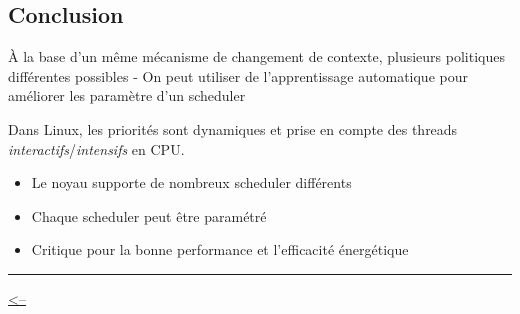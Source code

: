 \subsection{Conclusion}\label{conclusion}

À la base d'un même mécanisme de changement de contexte, plusieurs
politiques différentes possibles - On peut utiliser de l'apprentissage
automatique pour améliorer les paramètre d'un scheduler

Dans Linux, les priorités sont dynamiques et prise en compte des threads
\emph{interactifs}/\emph{intensifs} en CPU.

\begin{itemize}
\tightlist
\item
  Le noyau supporte de nombreux scheduler différents
\item
  Chaque scheduler peut être paramétré
\item
  Critique pour la bonne performance et l'efficacité énergétique
\end{itemize}

\begin{center}\rule{0.5\linewidth}{0.5pt}\end{center}

\href{../README.md}{\textless--}
